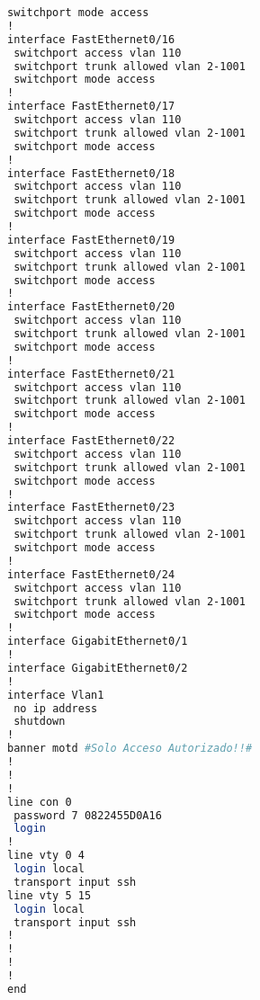 \begin{lstlisting}[language=Bash, caption={Configuración Completa Switch Atención Pacientes}]
 switchport mode access
!
interface FastEthernet0/16
 switchport access vlan 110
 switchport trunk allowed vlan 2-1001
 switchport mode access
!
interface FastEthernet0/17
 switchport access vlan 110
 switchport trunk allowed vlan 2-1001
 switchport mode access
!
interface FastEthernet0/18
 switchport access vlan 110
 switchport trunk allowed vlan 2-1001
 switchport mode access
!
interface FastEthernet0/19
 switchport access vlan 110
 switchport trunk allowed vlan 2-1001
 switchport mode access
!
interface FastEthernet0/20
 switchport access vlan 110
 switchport trunk allowed vlan 2-1001
 switchport mode access
!
interface FastEthernet0/21
 switchport access vlan 110
 switchport trunk allowed vlan 2-1001
 switchport mode access
!
interface FastEthernet0/22
 switchport access vlan 110
 switchport trunk allowed vlan 2-1001
 switchport mode access
!
interface FastEthernet0/23
 switchport access vlan 110
 switchport trunk allowed vlan 2-1001
 switchport mode access
!
interface FastEthernet0/24
 switchport access vlan 110
 switchport trunk allowed vlan 2-1001
 switchport mode access
!
interface GigabitEthernet0/1
!
interface GigabitEthernet0/2
!
interface Vlan1
 no ip address
 shutdown
!
banner motd #Solo Acceso Autorizado!!#
!
!
!
line con 0
 password 7 0822455D0A16
 login
!
line vty 0 4
 login local
 transport input ssh
line vty 5 15
 login local
 transport input ssh
!
!
!
!
end
\end{lstlisting}
